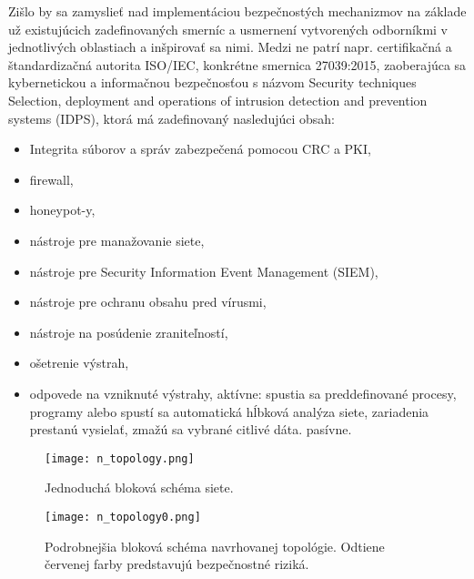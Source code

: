 \documentclass[12pt,a4paper,oneside,openright]{report}
\begin{document}
Zišlo by sa zamyslieť nad implementáciou bezpečnostých mechanizmov na základe už existujúcich zadefinovaných smerníc a usmernení vytvorených odborníkmi v jednotlivých oblastiach a inšpirovať sa nimi. Medzi ne patrí napr. certifikačná a štandardizačná autorita ISO/IEC, konkrétne smernica 27039:2015, zaoberajúca sa kybernetickou a informačnou bezpečnosťou s názvom Security techniques Selection, deployment and operations of intrusion detection and prevention systems (IDPS)\cite{iso27039}, ktorá má zadefinovaný nasledujúci obsah:
\begin{itemize}
\item Integrita súborov a správ zabezpečená pomocou CRC a PKI,
\item firewall,
\item honeypot-y,
\item nástroje pre manažovanie siete,
\item nástroje pre Security Information Event Management (SIEM),
\item nástroje pre ochranu obsahu pred vírusmi,
\item nástroje na posúdenie zraniteľností,
\item ošetrenie výstrah,
\item odpovede na vzniknuté výstrahy,
\subitem aktívne: spustia sa preddefinované procesy, programy alebo spustí sa automatická hĺbková analýza siete, zariadenia prestanú vysielať, zmažú sa vybrané citlivé dáta.
\subitem pasívne.
\end{itemize}
\onehalfspacing


\begin{figure*}[h]
	\centering
	\texttt{[image: n\_topology.png]}
	\caption{Jednoduchá bloková schéma siete.}
	\label{f:o_blok_topology}
\end{figure*}

\begin{figure*}[h]
	\centering
	\texttt{[image: n\_topology0.png]}
	\caption{Podrobnejšia bloková schéma navrhovanej topológie. Odtiene červenej farby predstavujú bezpečnostné riziká.}
	\label{f:o_advanced_topology}
\end{figure*}
\end{document}
